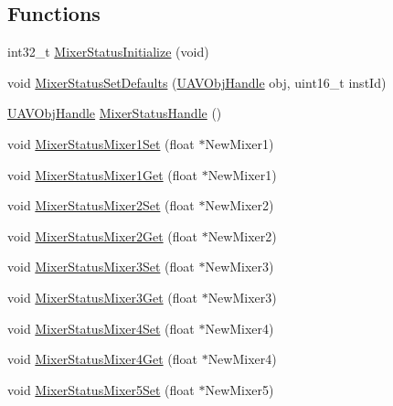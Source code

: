 \subsection*{\-Functions}
\begin{DoxyCompactItemize}
\item 
int32\-\_\-t \hyperlink{group___mixer_status_ga0fb2373a2a9e504567cfd0d3052fe802}{\-Mixer\-Status\-Initialize} (void)
\item 
void \hyperlink{group___mixer_status_gafd78bfabe8f6238b9eb4bd1b608cbb86}{\-Mixer\-Status\-Set\-Defaults} (\hyperlink{targets_2_u_a_v_objects_2inc_2uavobjectmanager_8h_a279053e22be53ce9f895043aaeb91e3b}{\-U\-A\-V\-Obj\-Handle} obj, uint16\-\_\-t inst\-Id)
\item 
\hyperlink{targets_2_u_a_v_objects_2inc_2uavobjectmanager_8h_a279053e22be53ce9f895043aaeb91e3b}{\-U\-A\-V\-Obj\-Handle} \hyperlink{group___mixer_status_gaa6d02d2f8a2f01f0885adfce6d26468e}{\-Mixer\-Status\-Handle} ()
\item 
void \hyperlink{group___mixer_status_gacadf3704391449680d6a7da68b7df1ca}{\-Mixer\-Status\-Mixer1\-Set} (float $\ast$\-New\-Mixer1)
\item 
void \hyperlink{group___mixer_status_ga1aebff5e7046237f3da1836b50068b20}{\-Mixer\-Status\-Mixer1\-Get} (float $\ast$\-New\-Mixer1)
\item 
void \hyperlink{group___mixer_status_ga752880a4b0bb65adb319e5d1c9fe6ad6}{\-Mixer\-Status\-Mixer2\-Set} (float $\ast$\-New\-Mixer2)
\item 
void \hyperlink{group___mixer_status_ga498c50abc32ac2651eafda70e1b1672f}{\-Mixer\-Status\-Mixer2\-Get} (float $\ast$\-New\-Mixer2)
\item 
void \hyperlink{group___mixer_status_ga0c7c7dbd755e7cd3d983181f1071f801}{\-Mixer\-Status\-Mixer3\-Set} (float $\ast$\-New\-Mixer3)
\item 
void \hyperlink{group___mixer_status_ga5470dd2637a1b67e147ef5a2bbc3c2fa}{\-Mixer\-Status\-Mixer3\-Get} (float $\ast$\-New\-Mixer3)
\item 
void \hyperlink{group___mixer_status_gabe3cd83955bd79fd6dd25be97d35d7be}{\-Mixer\-Status\-Mixer4\-Set} (float $\ast$\-New\-Mixer4)
\item 
void \hyperlink{group___mixer_status_ga16e151661b0b56baf73c5727903055d0}{\-Mixer\-Status\-Mixer4\-Get} (float $\ast$\-New\-Mixer4)
\item 
void \hyperlink{group___mixer_status_ga5ede813546e0a9f2879762993709aca1}{\-Mixer\-Status\-Mixer5\-Set} (float $\ast$\-New\-Mixer5)
\item 

\end{DoxyCompactItemize}
